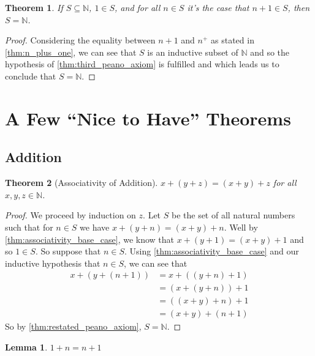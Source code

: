 \documentclass{article}
\theoremstyle{definition}
\theoremstyle{definition}
\theoremstyle{plain}
\theoremstyle{remark}
\theoremstyle{plain}
\newtheorem{theorem}{Theorem}[section]
\theoremstyle{remark}
\theoremstyle{plain}
\newtheorem{lemma}{Lemma}[section]
\theoremstyle{plain}
\theoremstyle{plain}
\theoremstyle{plain}
\begin{document}
\begin{theorem}
  If \( S \subseteq \mathbb{N} \), \( 1 \in S \), and for all \( n \in S \) it's 
  the case that \( n + 1 \in S \), then \( S = \mathbb{N} \).
  \label{thm:restated_peano_axiom}
\end{theorem}

\begin{proof}
  Considering the equality between \( n + 1 \) and \( n^{+} \) as stated 
  in \autoref{thm:n_plus_one}, we can see that \( S \) is an inductive subset
  of \( \mathbb{N} \) and so the hypothesis of \autoref{thm:third_peano_axiom} 
  is fulfilled and which leads us to conclude that \( S = \mathbb{N} \).
\end{proof}

\newpage

\section{A Few ``Nice to Have'' Theorems}

\subsection{Addition}

\begin{theorem}[Associativity of Addition]
 \( x + ( y + z )  = (x + y) + z \) for all \( x, y, z \in \mathbb{N} \).
\end{theorem}

\begin{proof}
  We proceed by induction on \( z \). Let \( S \) be the set of all natural 
  numbers such that for \( n \in S \) we have \( x + (y + n) = (x + y) + n\). 
  Well by \autoref{thm:associativity_base_case}, we know that 
  \( x + (y + 1) = (x + y) + 1 \) and so \( 1 \in S \). So suppose that 
  \( n \in S \). Using \autoref{thm:associativity_base_case} and our inductive 
  hypothesis that \( n \in S \), we can see that
  \begin{align*}
    x + (y + (n + 1)) &= x + ((y + n) + 1) \\
                      &= (x + (y + n)) + 1 \\
                      &= ((x + y) + n) + 1 \\
                      &= (x + y) + (n + 1)
  \end{align*}
  So by \autoref{thm:restated_peano_axiom}, \( S = \mathbb{N} \).
\end{proof}

\begin{lemma}
  \( 1 + n = n + 1 \)
  \label{thm:commutativity_base_case}
\end{lemma}
\end{document}
